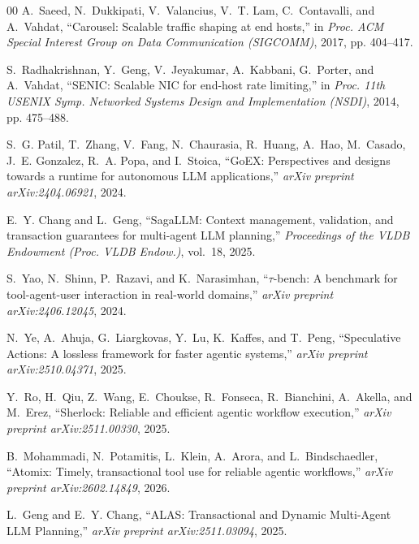 \documentclass[conference,10pt]{IEEEtran}
\begin{document}
\begin{thebibliography}{00}
A.~Saeed, N.~Dukkipati, V.~Valancius, V.~T. Lam, C.~Contavalli, and A.~Vahdat, ``Carousel: Scalable traffic shaping at end hosts,'' in \emph{Proc. ACM Special Interest Group on Data Communication (SIGCOMM)}, 2017, pp. 404--417.

S.~Radhakrishnan, Y.~Geng, V.~Jeyakumar, A.~Kabbani, G.~Porter, and A.~Vahdat, ``SENIC: Scalable NIC for end-host rate limiting,'' in \emph{Proc. 11th USENIX Symp. Networked Systems Design and Implementation (NSDI)}, 2014, pp. 475--488.

S.~G. Patil, T.~Zhang, V.~Fang, N.~Chaurasia, R.~Huang, A.~Hao, M.~Casado, J.~E. Gonzalez, R.~A. Popa, and I.~Stoica, ``GoEX: Perspectives and designs towards a runtime for autonomous LLM applications,'' \emph{arXiv preprint arXiv:2404.06921}, 2024.

E.~Y. Chang and L.~Geng, ``SagaLLM: Context management, validation, and transaction guarantees for multi-agent LLM planning,'' \emph{Proceedings of the VLDB Endowment (Proc. VLDB Endow.)}, vol.~18, 2025.

S.~Yao, N.~Shinn, P.~Razavi, and K.~Narasimhan, ``$\tau$-bench: A benchmark for tool-agent-user interaction in real-world domains,'' \emph{arXiv preprint arXiv:2406.12045}, 2024.

N.~Ye, A.~Ahuja, G.~Liargkovas, Y.~Lu, K.~Kaffes, and T.~Peng, ``Speculative Actions: A lossless framework for faster agentic systems,'' \emph{arXiv preprint arXiv:2510.04371}, 2025.

Y.~Ro, H.~Qiu, Z.~Wang, E.~Choukse, R.~Fonseca, R.~Bianchini, A.~Akella, and M.~Erez, ``Sherlock: Reliable and efficient agentic workflow execution,'' \emph{arXiv preprint arXiv:2511.00330}, 2025.

B.~Mohammadi, N.~Potamitis, L.~Klein, A.~Arora, and L.~Bindschaedler, ``Atomix: Timely, transactional tool use for reliable agentic workflows,'' \emph{arXiv preprint arXiv:2602.14849}, 2026.

L.~Geng and E.~Y. Chang, ``ALAS: Transactional and Dynamic Multi-Agent LLM Planning,'' \emph{arXiv preprint arXiv:2511.03094}, 2025.
\end{thebibliography}
\end{document}
